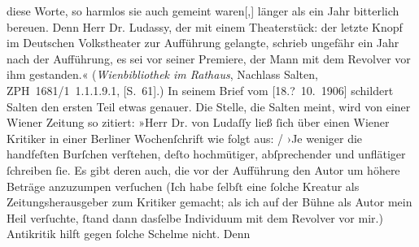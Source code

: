 \begin{ledgroupsized}[t]{13cm}
{{{                     diese Worte, so harmlos sie auch gemeint waren{[},{]} länger als
                     ein Jahr bitterlich bereuen. Denn Herr Dr. Ludassy, der mit einem Theaterstück: der letzte Knopf im Deutschen
                        Volkstheater zur Aufführung gelangte, schrieb ungefähr ein Jahr nach
                     der Aufführung, es sei vor seiner Premiere, der Mann mit dem Revolver vor ihm
                     gestanden.« (\emph{Wienbibliothek im Rathaus}, Nachlass Salten, ZPH 1681/1 1.1.1.9.1, [S. 61].) In seinem
                  Brief vom [18.? 10. 1906] schildert
                  Salten den ersten Teil etwas genauer.             
                  Die Stelle, die Salten meint, wird von einer Wiener Zeitung so zitiert: »Herr Dr. von Ludaſſy ließ ſich über
                        einen Wiener Kritiker in einer Berliner Wochenſchrift wie folgt aus:{ / }›Je weniger die handfeſten Burſchen verſtehen, deſto hochmütiger,
                        abſprechender und unflätiger ſchreiben ſie. Es gibt deren auch, die vor der
                        Aufführung den Autor um höhere Beträge anzuzumpen verſuchen (Ich habe ſelbſt
                        eine ſolche Kreatur als Zeitungsherausgeber zum Kritiker gemacht; als ich
                        auf der Bühne als Autor mein Heil verſuchte, ſtand dann dasſelbe Individuum
                        mit dem Revolver vor mir.) Antikritik hilft gegen ſolche Schelme nicht. Denn
}}}
\end{ledgroupsized}
